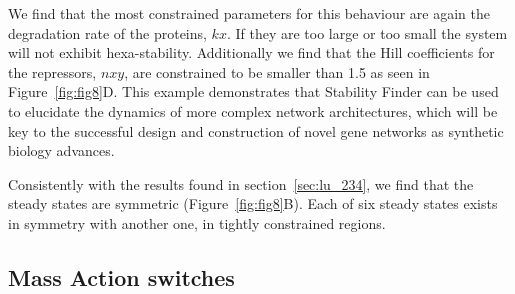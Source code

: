 We find that the most constrained parameters for this behaviour are again the degradation rate of the proteins, $kx$. If they are too large or too small the system will not exhibit hexa-stability. Additionally we find that the Hill coefficients for the repressors, $nxy$, are constrained to be smaller than 1.5 as seen in Figure~\ref{fig:fig8}D. This example demonstrates that Stability Finder can be used to elucidate the dynamics of more complex network architectures, which will be key to the successful design and construction of novel gene networks as synthetic biology advances.

Consistently with the results found in section~\ref{sec:lu_234}, we find that the steady states are symmetric (Figure~\ref{fig:fig8}B). Each of six steady states exists in symmetry with another one, in tightly constrained regions. 



\subsection{Mass Action switches}
\label{sec:ma_sw}						

